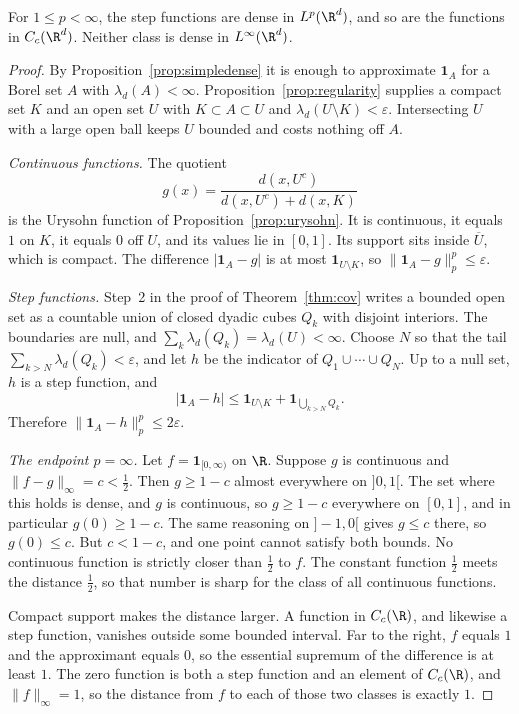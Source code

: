 \begin{theorem}\label{thm:ccdense}
For $1\le p<\infty$, the step functions are dense in $L^p(\R^d)$, and so are the functions in $C_c(\R^d)$. Neither class is dense in $L^\infty(\R^d)$.
\end{theorem}
\begin{proof}
By Proposition~\ref{prop:simpledense} it is enough to approximate $\mathbf 1_A$ for a Borel set $A$ with $\lambda_d(A)<\infty$. Proposition~\ref{prop:regularity} supplies a compact set $K$ and an open set $U$ with $K\subset A\subset U$ and $\lambda_d(U\setminus K)<\varepsilon$. Intersecting $U$ with a large open ball keeps $U$ bounded and costs nothing off $A$.

\emph{Continuous functions.} The quotient
\[g(x)=\frac{d(x,U^c)}{d(x,U^c)+d(x,K)}\]
is the Urysohn function of Proposition~\ref{prop:urysohn}. It is continuous, it equals $1$ on $K$, it equals $0$ off $U$, and its values lie in $[0,1]$. Its support sits inside $\overline U$, which is compact. The difference $|\mathbf 1_A-g|$ is at most $\mathbf 1_{U\setminus K}$, so $\|\mathbf 1_A-g\|_p^p\le\varepsilon$.

\emph{Step functions.} Step~2 in the proof of Theorem~\ref{thm:cov} writes a bounded open set as a countable union of closed dyadic cubes $Q_k$ with disjoint interiors. The boundaries are null, and $\sum_k\lambda_d(Q_k)=\lambda_d(U)<\infty$. Choose $N$ so that the tail $\sum_{k>N}\lambda_d(Q_k)<\varepsilon$, and let $h$ be the indicator of $Q_1\cup\cdots\cup Q_N$. Up to a null set, $h$ is a step function, and
\[|\mathbf 1_A-h|\le\mathbf 1_{U\setminus K}+\mathbf 1_{\bigcup_{k>N}Q_k}.\]
Therefore $\|\mathbf 1_A-h\|_p^p\le2\varepsilon$.

\emph{The endpoint $p=\infty$.} Let $f=\mathbf 1_{[0,\infty)}$ on $\R$. Suppose $g$ is continuous and $\|f-g\|_\infty=c<\frac12$. Then $g\ge1-c$ almost everywhere on $]0,1[$. The set where this holds is dense, and $g$ is continuous, so $g\ge1-c$ everywhere on $[0,1]$, and in particular $g(0)\ge1-c$. The same reasoning on $]-1,0[$ gives $g\le c$ there, so $g(0)\le c$. But $c<1-c$, and one point cannot satisfy both bounds. No continuous function is strictly closer than $\frac12$ to $f$. The constant function $\frac12$ meets the distance $\frac12$, so that number is sharp for the class of all continuous functions.

Compact support makes the distance larger. A function in $C_c(\R)$, and likewise a step function, vanishes outside some bounded interval. Far to the right, $f$ equals $1$ and the approximant equals $0$, so the essential supremum of the difference is at least $1$. The zero function is both a step function and an element of $C_c(\R)$, and $\|f\|_\infty=1$, so the distance from $f$ to each of those two classes is exactly $1$.
\end{proof}

